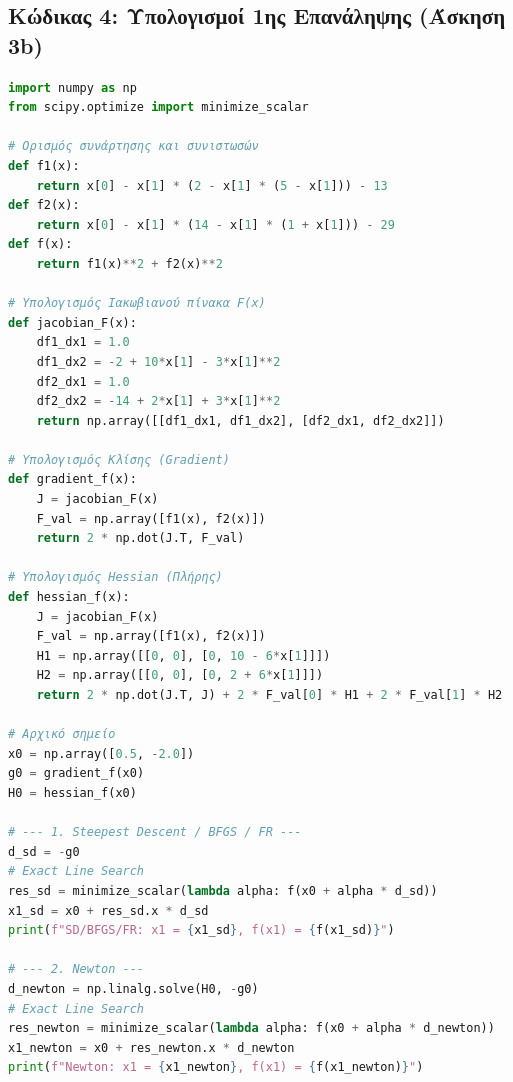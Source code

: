 \documentclass[a4paper,12pt]{article}
\begin{document}
\subsection*{Κώδικας 4: Υπολογισμοί 1ης Επανάληψης (Άσκηση 3b)}
\begin{lstlisting}[language=Python]
import numpy as np
from scipy.optimize import minimize_scalar

# Ορισμός συνάρτησης και συνιστωσών
def f1(x):
    return x[0] - x[1] * (2 - x[1] * (5 - x[1])) - 13
def f2(x):
    return x[0] - x[1] * (14 - x[1] * (1 + x[1])) - 29
def f(x):
    return f1(x)**2 + f2(x)**2

# Υπολογισμός Ιακωβιανού πίνακα F(x)
def jacobian_F(x):
    df1_dx1 = 1.0
    df1_dx2 = -2 + 10*x[1] - 3*x[1]**2
    df2_dx1 = 1.0
    df2_dx2 = -14 + 2*x[1] + 3*x[1]**2
    return np.array([[df1_dx1, df1_dx2], [df2_dx1, df2_dx2]])

# Υπολογισμός Κλίσης (Gradient)
def gradient_f(x):
    J = jacobian_F(x)
    F_val = np.array([f1(x), f2(x)])
    return 2 * np.dot(J.T, F_val)

# Υπολογισμός Hessian (Πλήρης)
def hessian_f(x):
    J = jacobian_F(x)
    F_val = np.array([f1(x), f2(x)])
    H1 = np.array([[0, 0], [0, 10 - 6*x[1]]])
    H2 = np.array([[0, 0], [0, 2 + 6*x[1]]])
    return 2 * np.dot(J.T, J) + 2 * F_val[0] * H1 + 2 * F_val[1] * H2

# Αρχικό σημείο
x0 = np.array([0.5, -2.0])
g0 = gradient_f(x0)
H0 = hessian_f(x0)

# --- 1. Steepest Descent / BFGS / FR ---
d_sd = -g0
# Exact Line Search
res_sd = minimize_scalar(lambda alpha: f(x0 + alpha * d_sd))
x1_sd = x0 + res_sd.x * d_sd
print(f"SD/BFGS/FR: x1 = {x1_sd}, f(x1) = {f(x1_sd)}")

# --- 2. Newton ---
d_newton = np.linalg.solve(H0, -g0)
# Exact Line Search
res_newton = minimize_scalar(lambda alpha: f(x0 + alpha * d_newton))
x1_newton = x0 + res_newton.x * d_newton
print(f"Newton: x1 = {x1_newton}, f(x1) = {f(x1_newton)}")
\end{lstlisting}
\end{document}
